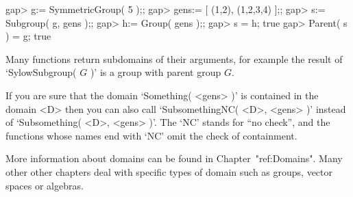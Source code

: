 \beginexample
gap> g:= SymmetricGroup( 5 );;
gap> gens:= [ (1,2), (1,2,3,4) ];;
gap> s:= Subgroup( g, gens );;
gap> h:= Group( gens );;
gap> s = h;
true
gap> Parent( s ) = g;
true
\endexample

Many functions return subdomains of their arguments, for example
the result of `SylowSubgroup( $G$ )' is a group with parent group $G$.

If you are sure that the domain `Something( <gens> )' is contained in the
domain <D> then you can also call `SubsomethingNC( <D>, <gens> )' instead
of `Subsomething( <D>, <gens> )'.
The `NC' stands for ``no check'', and the functions whose names end with
`NC' omit the check of containment.

More information about domains can be found in
Chapter~"ref:Domains". Many other other chapters deal with specific
types of domain such as groups, vector spaces or algebras.




